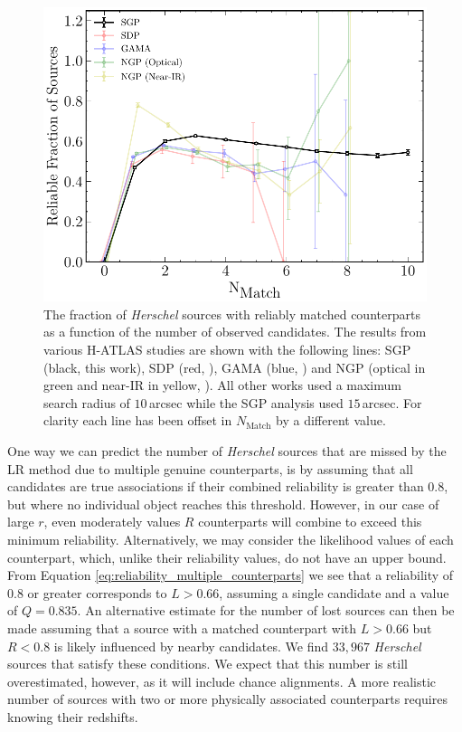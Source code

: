 \begin{figure}
    \centering
    \includegraphics[width=0.8\columnwidth]{Figures/multiplicity.pdf}
    \caption[Reliable fraction of sources as a function of the number of candidates]{The fraction of \textit{Herschel} sources with reliably matched counterparts as a function of the number of observed candidates. The results from various H-ATLAS studies are shown with the following lines: SGP (black, this work), SDP (red, \citealt{Smith_2011}), GAMA (blue, \citealt{Bourne_2016}) and NGP (optical in green and near-IR in yellow, \citealt{Furlanetto_2018}). All other works used a maximum search radius of $10\,$arcsec while the SGP analysis used $15\,$arcsec. For clarity each line has been offset in $N_{\textrm{Match}}$ by a different value.}
    \label{fig:multiplicity}
\end{figure}

One way we can predict the number of \textit{Herschel} sources that are missed by the LR method due to multiple genuine counterparts, is by assuming that all candidates are true associations if their combined reliability is greater than $0.8$, but where no individual object reaches this threshold. However, in our case of large $r$, even moderately values $R$ counterparts will combine to exceed this minimum reliability. Alternatively, we may consider the likelihood values of each counterpart, which, unlike their reliability values, do not have an upper bound. From Equation \ref{eq:reliability_multiple_counterparts} we see that a reliability of $0.8$ or greater corresponds to $L > 0.66$, assuming a single candidate and a value of $Q = 0.835$. An alternative estimate for the number of lost sources can then be made assuming that a source with a matched counterpart with $L > 0.66$ but $R < 0.8$ is likely influenced by nearby candidates. We find $33,967$ \textit{Herschel} sources that satisfy these conditions. We expect that this number is still overestimated, however, as it will include chance alignments. A more realistic number of sources with two or more physically associated counterparts requires knowing their redshifts.

